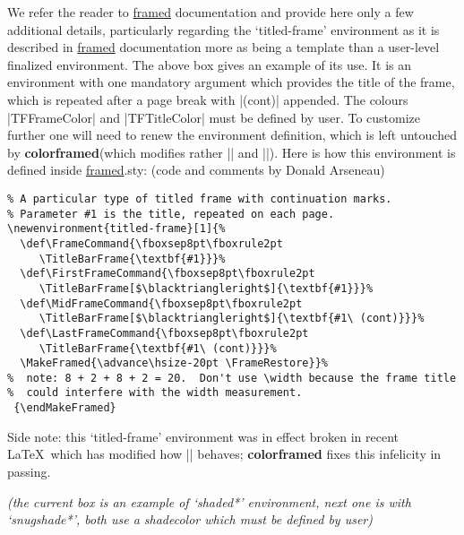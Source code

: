 \documentclass[a4paper,dvipdfmx,11pt,english]{article}
\def\ctanpackage#1{\href{https://ctan.org/pkg/#1}{#1}}
\newcommand\colorframed{%
        \texorpdfstring{{\color{joli}\bfseries colorframed}}{colorframed}\xspace}
\begin{document}
\begin{shaded*}
  We refer the reader to \ctanpackage{framed} documentation
  and provide here only a few additional details, particularly
  regarding the `titled-frame' environment as it is described
  in \ctanpackage{framed} documentation more as being a
  template than a user-level finalized environment.  The above
  box gives an example of its use.  It is an environment with
  one mandatory argument which provides the title of the
  frame, which is repeated after a page break with |(cont)|
  appended.  The colours |TFFrameColor| and
  |TFTitleColor| must be defined by user.  To customize
  further one will need to renew the environment definition,
  which is left untouched by \colorframed (which modifies
  rather |\TitleBarFrame| and |\CustomFBox|).  Here is
  how this environment is defined inside \ctanpackage{framed}.sty: (code and comments by Donald Arseneau)\par
\begin{footnotesize}
\begin{verbatim}
% A particular type of titled frame with continuation marks.  
% Parameter #1 is the title, repeated on each page.
\newenvironment{titled-frame}[1]{%
  \def\FrameCommand{\fboxsep8pt\fboxrule2pt
     \TitleBarFrame{\textbf{#1}}}%
  \def\FirstFrameCommand{\fboxsep8pt\fboxrule2pt
     \TitleBarFrame[$\blacktriangleright$]{\textbf{#1}}}%
  \def\MidFrameCommand{\fboxsep8pt\fboxrule2pt
     \TitleBarFrame[$\blacktriangleright$]{\textbf{#1\ (cont)}}}%
  \def\LastFrameCommand{\fboxsep8pt\fboxrule2pt
     \TitleBarFrame{\textbf{#1\ (cont)}}}%
  \MakeFramed{\advance\hsize-20pt \FrameRestore}}%
%  note: 8 + 2 + 8 + 2 = 20.  Don't use \width because the frame title
%  could interfere with the width measurement.
 {\endMakeFramed}
\end{verbatim}
\normalcolor
Side note: this `titled-frame' environment was in effect
broken in recent \LaTeX\ which has modified how |\smash|
behaves; \colorframed fixes this infelicity in passing.\par

\emph{(the current box is an example of \emph{`shaded*'} environment, next one is with
\emph{`snugshade*'}, both use a \emph{shadecolor} which must be defined by user)}
\par
\end{footnotesize}
\end{shaded*}
\end{document}

